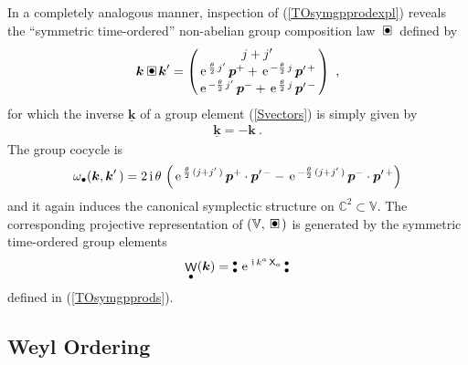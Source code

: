 \documentclass[11pt,a4paper]{article}
\DeclareMathOperator{\weyl}{{\sf W}}                   %
\newcommand{\compb}{\mkern+4mu\square\mkern-17.4mu{\mbox{
    \protect\raisebox{0.2ex}{$\bullet$}}\mkern+5mu}}    %
\newcommand{\NOb}{\mbox{$\substack{\bullet\\\bullet}$}} %
\newcommand{\1}{\mathbb{1}}
\newcommand{\mbf}[1]{{\boldsymbol {#1} }}
\def\ii{{\,{\rm i}\,}}
\def\X{{\sf X}}
\def\mk{{\mbf k}}
\def\mbp{{\mbf p}}
\def\mbbV{{\mathbb V}}
\newcommand{\complex}{{\mathbb C}} %
\def\e{{\,\rm e}\,}
\newcommand{\beq}{\begin{eqnarray}}
\newcommand{\eeq}{\end{eqnarray}}
\begin{document}
In a completely analogous manner, inspection of
(\ref{TOsymgpprodexpl}) reveals the ``symmetric time-ordered''
non-abelian group composition law $\compb$ defined by
\beq
\mk\compb\mk'=\begin{pmatrix}j+j'\,\\\e^{\frac{\theta}2\,j'}\,\mbp^++
\e^{-\frac{\theta}2\,j}\,\mbp^{\prime\,+}\,\\\e^{-\frac{\theta}2\,j'}\,
\mbp^-+\e^{\frac{\theta}2\,j}\,\mbp^{\prime\,-}\,\end{pmatrix} \ ,
\label{TOsymcomplaw}\eeq
for which the inverse $\underline{\mk}$ of a group element
(\ref{Svectors}) is simply given by
\beq
\underline{\mk}=-\mk \ .
\label{TOsyminverse}\eeq
The group cocycle is
\beq
\omega_\bullet(\mk,\mk'\,)=2\ii\theta\,\left(\e^{\frac{\theta}2\,
(j+j'\,)}\,\mbp^+\cdot\mbp^{\prime\,-}-\e^{-\frac{\theta}2\,
(j+j'\,)}\,\mbp^-\cdot\mbp^{\prime\,+}\right)
\label{TOsymcocycle}\eeq
and it again induces the canonical symplectic structure on
$\complex^2\subset\mbbV$. The corresponding projective representation
of $(\mbbV,\compb)$ is generated by the symmetric time-ordered group
elements
\beq
\weyl_\bullet(\mk)=\NOb\,\e^{\ii k^a\,\X_a}\,\NOb
\label{TOsymweylop}\eeq
defined in (\ref{TOsymgpprods}).

\subsection{Weyl Ordering\label{WOPGWS}}
\end{document}
